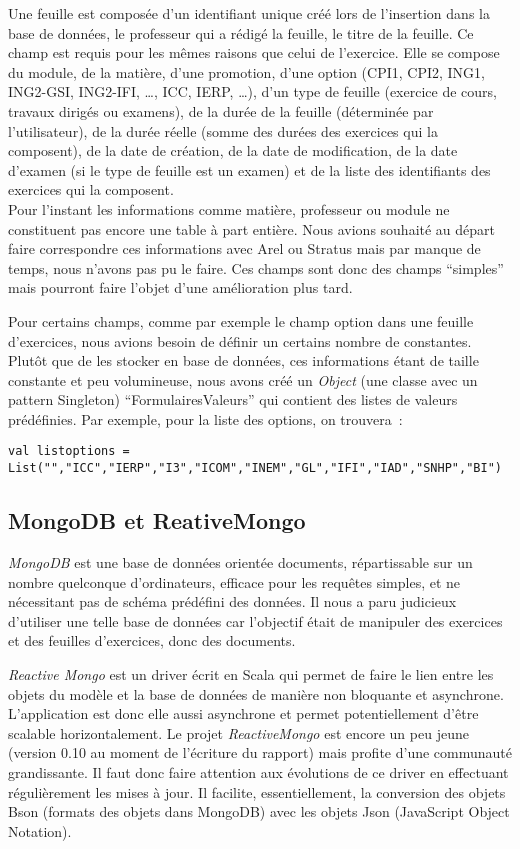 Une feuille est composée d'un identifiant unique créé lors de l'insertion dans la base de données, le professeur qui a rédigé la feuille, le titre de la feuille. Ce champ est requis pour les mêmes raisons que celui de l'exercice. Elle se compose du module, de la matière, d'une promotion, d'une option (CPI1, CPI2, ING1, ING2-GSI, ING2-IFI, \ldots, ICC, IERP, \ldots), d'un type de feuille (exercice de cours, travaux dirigés ou examens), de la durée de la feuille (déterminée par l'utilisateur), de la durée réelle (somme des durées des exercices qui la composent), de la date de création, de la date de modification, de la date d'examen (si le type de feuille est un examen) et de la liste des identifiants des exercices qui la composent. \\

Pour l'instant les informations comme matière, professeur ou module ne constituent pas encore une table à part entière. Nous avions souhaité au départ faire correspondre ces informations avec Arel ou Stratus mais par manque de temps, nous n'avons pas pu le faire. Ces champs sont donc des champs \enquote{simples} mais pourront faire l'objet d'une amélioration plus tard. 

Pour certains champs, comme par exemple le champ option dans une feuille d'exercices, nous avions besoin de définir un certains nombre de constantes. Plutôt que de les stocker en base de données, ces informations étant de taille constante et peu volumineuse, nous avons créé un \emph{Object} (une classe avec un pattern Singleton) \enquote{FormulairesValeurs} qui contient des listes de valeurs prédéfinies. Par exemple, pour la liste des options, on trouvera~:

\begin{lstlisting}
val listoptions = List("","ICC","IERP","I3","ICOM","INEM","GL","IFI","IAD","SNHP","BI")
\end{lstlisting} 

\subsection{MongoDB et ReativeMongo}
\emph{MongoDB} est une base de données orientée documents, répartissable sur un nombre quelconque d'ordinateurs, efficace pour les requêtes simples, et ne nécessitant pas de schéma prédéfini des données. Il nous a paru judicieux d'utiliser une telle base de données car l'objectif était de manipuler des exercices et des feuilles d'exercices, donc des documents. 

\emph{Reactive Mongo} est un driver écrit en Scala qui permet de faire le lien entre les objets du modèle et la base de données de manière non bloquante et asynchrone. L'application est donc elle aussi asynchrone et permet potentiellement d'être scalable horizontalement. Le projet \emph{ReactiveMongo} est encore un peu jeune (version 0.10 au moment de l'écriture du rapport) mais profite d'une communauté grandissante. Il faut donc faire attention aux évolutions de ce driver en effectuant régulièrement les mises à jour. Il facilite, essentiellement, la conversion des objets Bson (formats des objets dans MongoDB) avec les objets Json (JavaScript Object Notation).\\

